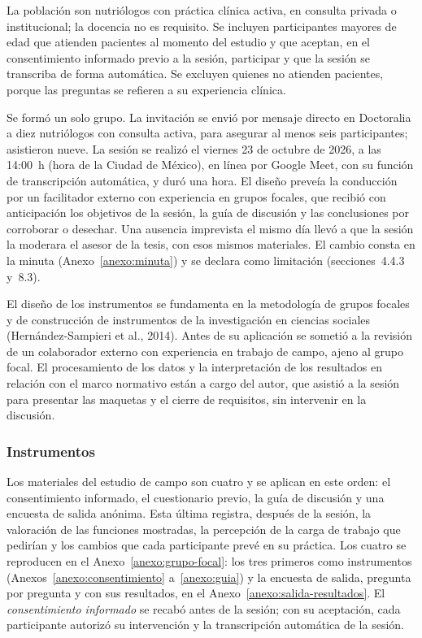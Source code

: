 \documentclass[12pt, a4paper]{article}
\begin{document}
La población son nutriólogos con práctica clínica activa, en consulta
privada o institucional; la docencia no es requisito. Se incluyen
participantes mayores de edad que atienden pacientes al momento del
estudio y que aceptan, en el consentimiento informado previo a la
sesión, participar y que la sesión se transcriba de forma automática. Se
excluyen quienes no atienden pacientes, porque las preguntas se refieren
a su experiencia clínica.
 
Se formó un solo grupo. La invitación se envió por mensaje directo en
Doctoralia a diez nutriólogos con consulta activa, para asegurar al
menos seis participantes; asistieron nueve. La sesión se realizó el
viernes 23 de octubre de 2026, a las 14:00~h (hora de la Ciudad de
México), en línea por Google Meet, con su función de transcripción
automática, y duró una hora. El diseño preveía la conducción por un
facilitador externo con experiencia en grupos focales, que recibió con
anticipación los objetivos de la sesión, la guía de discusión y las
conclusiones por corroborar o desechar. Una ausencia imprevista el mismo
día llevó a que la sesión la moderara el asesor de la tesis, con esos
mismos materiales. El cambio consta en la minuta
(Anexo~\ref{anexo:minuta}) y se declara como limitación (secciones~4.4.3
y~8.3).

El diseño de los instrumentos se fundamenta en la metodología de grupos
focales y de construcción de instrumentos de la investigación en
ciencias sociales (Hernández-Sampieri et al., 2014). Antes de su
aplicación se sometió a la revisión de un colaborador externo con
experiencia en trabajo de campo, ajeno al grupo focal. El procesamiento
de los datos y la interpretación de los resultados en relación con el
marco normativo están a cargo del autor, que asistió a la sesión para
presentar las maquetas y el cierre de requisitos, sin intervenir en la
discusión.
 
\subsubsection{Instrumentos}
 
Los materiales del estudio de campo son cuatro y se aplican en este
orden: el consentimiento informado, el cuestionario previo, la guía de
discusión y una encuesta de salida anónima. Esta última registra,
después de la sesión, la valoración de las funciones mostradas, la
percepción de la carga de trabajo que pedirían y los cambios que cada
participante prevé en su práctica. Los cuatro se reproducen en el
Anexo~\ref{anexo:grupo-focal}: los tres primeros como instrumentos
(Anexos~\ref{anexo:consentimiento} a~\ref{anexo:guia}) y la encuesta de
salida, pregunta por pregunta y con sus resultados, en el
Anexo~\ref{anexo:salida-resultados}. El \textit{consentimiento
informado} se recabó antes de la sesión; con su aceptación, cada
participante autorizó su intervención y la transcripción automática de
la sesión.
 
\end{document}
